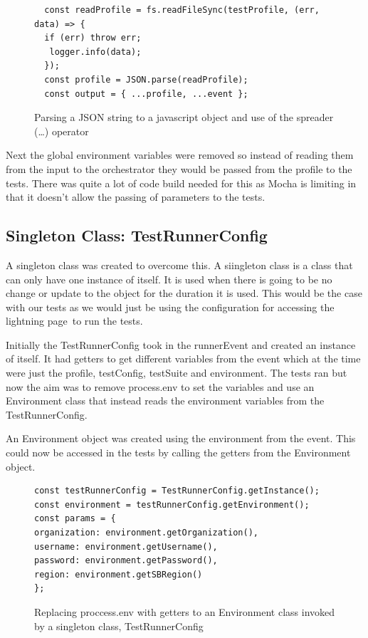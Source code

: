 \documentclass[12pt,a4paper,titlepage]{report}
\begin{document}
\begin{figure}[H]
 \begin{tcolorbox}
  \begin{verbatim}
  const readProfile = fs.readFileSync(testProfile, (err, data) => {
  if (err) throw err;
   logger.info(data);
  });
  const profile = JSON.parse(readProfile);
  const output = { ...profile, ...event };
  \end{verbatim}
 \end{tcolorbox}
 \caption{Parsing a JSON string to a javascript object and use of the spreader (\dots) operator}
\end{figure}

Next the global environment variables were removed so instead of reading them from the input to the orchestrator they would 
be passed from the profile to the tests. There was quite a lot of code build needed for this as Mocha is limiting in that it doesn't 
allow the passing of parameters to the tests. 

\subsection{Singleton Class: TestRunnerConfig}
A singleton class was created to overcome this. A siingleton class is a class that can only have one instance of 
itself. It is used when there is going to be no change or update to the object for the duration it is used. This would be the case with our tests as we would just be using the configuration for accessing the lightning page to run the tests.

Initially the TestRunnerConfig took in the runnerEvent and created an instance of itself. It had getters to get different variables from the event which at the time were just the profile, testConfig, testSuite and environment. The tests ran but now the aim was to remove process.env to set the variables and use an Environment class that instead reads the environment variables from the TestRunnerConfig.

An Environment object was created using the environment from the event. This could now be accessed in the tests by calling the getters from the Environment object.
\begin{figure}[H]
 \begin{tcolorbox}
  \begin{verbatim}
const testRunnerConfig = TestRunnerConfig.getInstance();
const environment = testRunnerConfig.getEnvironment();
const params = {
organization: environment.getOrganization(),
username: environment.getUsername(),
password: environment.getPassword(),
region: environment.getSBRegion()
};
\end{verbatim}
 \end{tcolorbox}
 \caption{Replacing proccess.env with getters to an Environment class invoked by a singleton class, TestRunnerConfig}
\end{figure}
\end{document}

